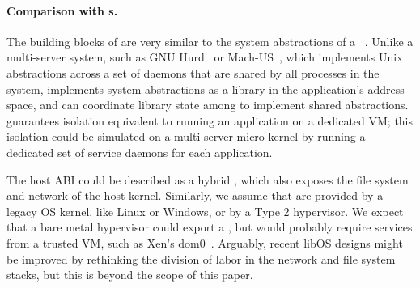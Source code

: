 \paragraph{Comparison with \microkernel{}s.}
The building blocks of \sysname{} are very similar to the system abstractions of a 
\microkernel{}~\citep{liedtke95sosp,klein09sel4,elphinstone13microkernels,liedtke93sosp,chen93memory,Baron:1985:MOE,Accetta:1986:MNK}.
Unlike a multi-server \microkernel{} system, such as GNU Hurd~\citep{hurd} or Mach-US~\citep{stevenson95mach-us},
which implements Unix abstractions across a set of daemons that are shared by all processes in the system,
\sysname{} implements system abstractions as a library in the application's address space,
and can coordinate library state among \picoprocs{} to implement shared abstractions.
\sysname{} guarantees isolation equivalent to running 
an application on a dedicated VM; this isolation could be simulated on a multi-server micro-kernel
by running a dedicated set of service daemons for each application.


The \sysname{} host ABI could be described as a hybrid \microkernel{},
which also exposes the file system and network of the host kernel.
Similarly, we assume that \picoprocs{} are provided by a legacy OS kernel, like Linux or Windows,
or by a Type 2 hypervisor.  We expect that a bare metal hypervisor could export a \pal{},
but would probably require services from a trusted VM, such as Xen's dom0~\citep{barham03xen}.
Arguably, recent libOS designs might be improved by rethinking the division of labor in
the network and file system stacks, but this is beyond the scope of this paper.

